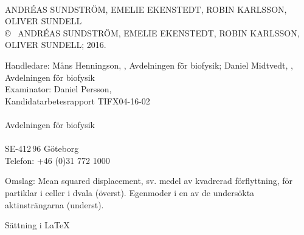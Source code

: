 
\clearpage
{}
\setcounter{page}{2}%
\thispagestyle{plain}

\begin{flushleft}


\vspace*{2cm}
\titel\\
\undertitel

ANDRÉAS SUNDSTRÖM, EMELIE EKENSTEDT, ROBIN KARLSSON, OLIVER SUNDELL \\[1cm]

\copyright ~ ANDRÉAS SUNDSTRÖM, EMELIE EKENSTEDT, ROBIN KARLSSON, OLIVER SUNDELL; 2016. 
\setlength{\parskip}{1cm}


Handledare: Måns Henningson, \institution, Avdelningen för biofysik;  Daniel Midtvedt, \institution, Avdelningen för biofysik\\
Examinator: Daniel Persson, \institution
\\[1cm]

Kandidatarbetesrapport TIFX04-16-02\\	%
\institution\\
Avdelningen för biofysik\\
\skola\\
SE-412\,96 Göteborg\\
Telefon: +46 (0)31 772 1000 
\setlength{\parskip}{0.5cm}

\vfill
Omslag: Mean squared displacement, sv. medel av kvadrerad förflyttning, för partiklar i celler i dvala (överst). Egenmoder i en av de undersökta aktinsträngarna (underst).
\setlength{\parskip}{1cm}

Sättning i \LaTeX \\
\hfill

\setcounter{footnote}{0} 

\end{flushleft}

\renewcommand{\thefootnote}{\arabic{footnote}}
\setcounter{footnote}{0} 


